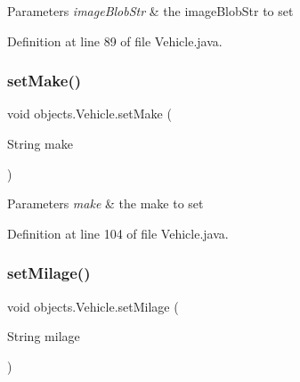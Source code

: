 \begin{DoxyParams}{Parameters}
{\em image\+Blob\+Str} & the image\+Blob\+Str to set \\
\hline
\end{DoxyParams}


Definition at line 89 of file Vehicle.\+java.


\begin{DoxyCode}{0}

\end{DoxyCode}
\mbox{\label{classobjects_1_1_vehicle_a42b62092af47c46a6a76ee809914d6ec}} 
\subsubsection{\texorpdfstring{setMake()}{setMake()}}
{\footnotesize\ttfamily void objects.\+Vehicle.\+set\+Make (\begin{DoxyParamCaption}\item[{String}]{make }\end{DoxyParamCaption})}


\begin{DoxyParams}{Parameters}
{\em make} & the make to set \\
\hline
\end{DoxyParams}


Definition at line 104 of file Vehicle.\+java.


\begin{DoxyCode}{0}

\end{DoxyCode}
\mbox{\label{classobjects_1_1_vehicle_aea5e8eca8d1de670e53c33dabc42b877}} 
\subsubsection{\texorpdfstring{setMilage()}{setMilage()}}
{\footnotesize\ttfamily void objects.\+Vehicle.\+set\+Milage (\begin{DoxyParamCaption}\item[{String}]{milage }\end{DoxyParamCaption})}


